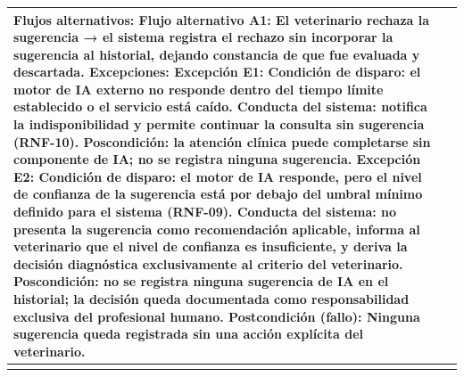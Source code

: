 \documentclass[
]{article}
\begin{document}
{\begin{longtable}[]{|
  >{\raggedright\arraybackslash}p{}|
  >{\raggedright\arraybackslash}p{}|}
\begin{minipage}[b]{\linewidth}
\textbf{Flujos alternativos:} Flujo alternativo A1: El veterinario rechaza la sugerencia → el sistema registra el rechazo sin incorporar la sugerencia al historial, dejando constancia de que fue evaluada y descartada.
\textbf{Excepciones:} Excepción E1: Condición de disparo: el motor de IA externo no responde dentro del tiempo límite establecido o el servicio está caído. Conducta del sistema: notifica la indisponibilidad y permite continuar la consulta sin sugerencia (RNF-10). Poscondición: la atención clínica puede completarse sin componente de IA; no se registra ninguna sugerencia. Excepción E2: Condición de disparo: el motor de IA responde, pero el nivel de confianza de la sugerencia está por debajo del umbral mínimo definido para el sistema (RNF-09). Conducta del sistema: no presenta la sugerencia como recomendación aplicable, informa al veterinario que el nivel de confianza es insuficiente, y deriva la decisión diagnóstica exclusivamente al criterio del veterinario. Poscondición: no se registra ninguna sugerencia de IA en el historial; la decisión queda documentada como responsabilidad exclusiva del profesional humano.
\textbf{Postcondición (fallo):} Ninguna sugerencia queda registrada sin una acción explícita del veterinario.
\end{minipage} \\
\hline
\endhead
\hline
\endlastfoot
\end{longtable}
}
\end{document}
